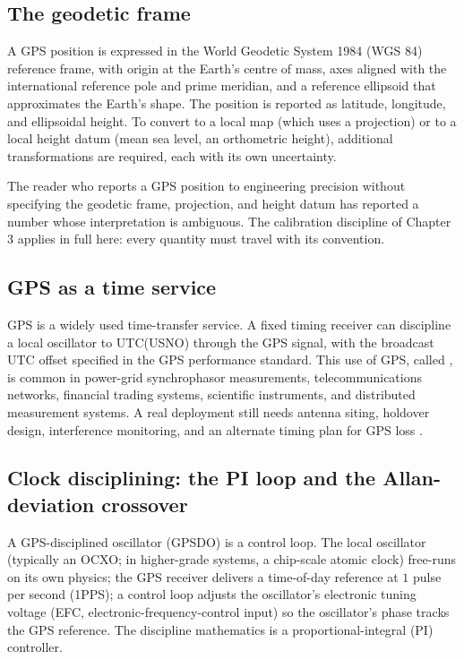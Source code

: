 \subsection{The geodetic frame}

A GPS position is expressed in the World Geodetic System 1984
(WGS 84) reference frame, with origin at the Earth's centre of
mass, axes aligned with the international reference pole and prime
meridian, and a reference ellipsoid that approximates the Earth's
shape. The position is reported as latitude, longitude, and ellipsoidal height. To convert to a local map (which uses a
projection) or to a local height datum (mean sea level, an
orthometric height), additional transformations are required, each
with its own uncertainty.

The reader who reports a GPS position to engineering precision
without specifying the geodetic frame, projection, and height datum
has reported a number whose interpretation is ambiguous. The
calibration discipline of Chapter 3 applies in full here: every
quantity must travel with its convention.

\subsection{GPS as a time service}

GPS is a widely used time-transfer service. A fixed timing receiver
can discipline a local oscillator to UTC(USNO) through the GPS
signal, with the broadcast UTC offset specified in the GPS
performance standard. This use of GPS, called , is common in power-grid
synchrophasor measurements, telecommunications networks, financial
trading systems, scientific instruments, and distributed
measurement systems. A real deployment still needs antenna siting,
holdover design, interference monitoring, and an alternate timing
plan for GPS loss \cite{web:usno-gps-time,std:gps-sps-2020}.

\subsection{Clock disciplining: the PI loop and the Allan-deviation
crossover}

A GPS-disciplined oscillator (GPSDO) is a control loop. The local
oscillator (typically an OCXO; in higher-grade systems, a
chip-scale atomic clock) free-runs on its own physics; the GPS
receiver delivers a time-of-day reference at $1$ pulse per second
(1PPS); a control loop adjusts the oscillator's electronic tuning
voltage (EFC, electronic-frequency-control input) so the
oscillator's phase tracks the GPS reference. The discipline
mathematics is a proportional-integral (PI) controller.

